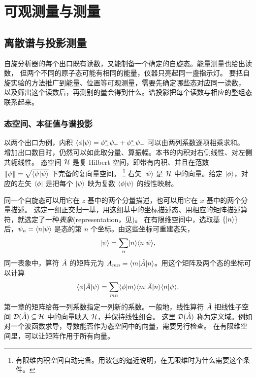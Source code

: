 \chapter{可观测量与测量}
\label{ch:observables}

\section{离散谱与投影测量}

自旋分析器的每个出口既有读数，又能制备一个确定的自旋态。能量测量也给出读数，
但两个不同的原子态可能有相同的能量，仪器只亮起同一盏指示灯。
要把自旋实验的方法推广到能量、位置等可观测量，需要先确定哪些态对应同一读数，
以及筛出这个读数后，再测别的量会得到什么。谱投影把每个读数与相应的整组态联系起来。

\subsection{态空间、本征值与谱投影}
以两个出口为例，内积 $\langle\phi\vert\psi\rangle = \phi_+^\ast\psi_+ + \phi_-^\ast\psi_-$ 可以由两列系数逐项相乘求和。
增加出口数目时，仍然可以如此取分量、算振幅。本书的内积对右侧线性、对左侧共轭线性。
态空间 $\mathcal H$ 是复 Hilbert 空间，即带有内积、并且在范数 $\lVert\psi\rVert = \sqrt{\langle\psi\vert\psi\rangle}$ 下完备的复向量空间。%
\footnote{有限维内积空间自动完备。用波包的逼近说明，在无限维时为什么需要这个条件。}
右矢 $\lvert\psi\rangle$ 是 $\mathcal H$ 中的向量。给定 $\lvert\phi\rangle$，对应的左矢 $\langle\phi\rvert$ 是把每个 $\lvert\psi\rangle$ 映为复数 $\langle\phi\vert\psi\rangle$ 的线性映射。

同一个自旋态可以用它在 $z$ 基中的两个分量描述，也可以用它在 $x$ 基中的两个分量描述。
选定一组正交归一基，用这组基中的坐标描述态、用相应的矩阵描述算符，就选定了一种\emph{表象}(representation，见)。
在有限维空间中，选取基 $\{\lvert n\rangle\}$ 后，$\psi_n = \langle n\vert\psi\rangle$ 是态的第 $n$ 个坐标。由这些坐标可重建态矢，
\begin{equation}
    \lvert\psi\rangle = \sum_n\lvert n\rangle\langle n\vert\psi\rangle,
\end{equation}
同一表象中，算符 $\hat{A}$ 的矩阵元为 $A_{mn} = \langle m\vert\hat{A}\vert n\rangle$。用这个矩阵及两个态的坐标可以计算
\begin{equation}
    \langle\phi\vert\hat{A}\vert\psi\rangle = \sum_{mn}\langle\phi\vert m\rangle\langle m\vert\hat{A}\vert n\rangle\langle n\vert\psi\rangle.
\end{equation}
第一章的矩阵给每一列系数指定一列新的系数。一般地，线性算符 $\hat{A}$ 把线性子空间 $\mathcal D(\hat{A}) \subseteq \mathcal H$ 中的向量映入 $\mathcal H$，并保持线性组合。
这里 $\mathcal D(\hat{A})$ 称为定义域。例如对一个波函数求导，导数能否作为态空间中的向量，需要另行检查。
在有限维空间里，可以让矩阵作用于所有向量。

